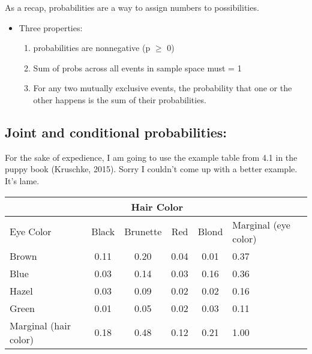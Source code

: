 \documentclass[12pt]{article}
\begin{document}
As a recap, probabilities are a way to assign numbers to possibilities. 
\begin{itemize}
  \item Three properties:
  \begin{enumerate}
    \item probabilities are nonnegative (p $\ge$ 0)
    \item Sum of probs across all events in sample space must = 1
    \item For any two mutually exclusive events, the probability that one or the other happens is the sum of their probabilities.
  \end{enumerate}
\end{itemize}

\subsection*{Joint and conditional probabilities:}

For the sake of expedience, I am going to use the example table from 4.1 in the puppy book (Kruschke, 2015). Sorry I couldn't come up with a better example. It's lame. 

\begin{table}[ht]
\centering
\begin{tabular}{l|cccc|l}
  \hline
  & \multicolumn{4}{c}{Hair Color} & \\
  \hline
 Eye Color & Black & Brunette & Red & Blond & Marginal (eye color) \\ 
  \hline
Brown & 0.11 & 0.20 & 0.04 & 0.01 & 0.37 \\ 
  Blue & 0.03 & 0.14 & 0.03 & 0.16 & 0.36 \\ 
  Hazel & 0.03 & 0.09 & 0.02 & 0.02 & 0.16 \\ 
  Green & 0.01 & 0.05 & 0.02 & 0.03 & 0.11 \\ 
  \hline
  Marginal (hair color) & 0.18 & 0.48 & 0.12 & 0.21 & 1.00 \\ 
   \hline
\end{tabular}
\end{table}
\end{document}
